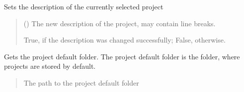 \documentclass[letterpaper,10pt,english]{sphinxmanual}
\begin{document}
\begin{fulllineitems}
\begin{fulllineitems}
\begin{quote}
\begin{description}
\sphinxAtStartPar
{}

\end{description}\end{quote}

\end{fulllineitems}


\begin{fulllineitems}
\label{\detokenize{apidoc/src.osm_configurator.control:src.osm_configurator.control.settings_controller.SettingsController.set_project_description}}
\pysigstartsignatures
{}
\pysigstopsignatures
\sphinxAtStartPar
Sets the description of the currently selected project
\begin{quote}\begin{description}
\sphinxAtStartPar
{} () \textendash{} The new description of the project, may contain line breaks.

\sphinxAtStartPar
True, if the description was changed successfully; False, otherwise.

\sphinxAtStartPar
{}

\end{description}\end{quote}

\end{fulllineitems}


\begin{fulllineitems}
\label{\detokenize{apidoc/src.osm_configurator.control:src.osm_configurator.control.settings_controller.SettingsController.get_project_default_folder}}
\pysigstartsignatures
{}
\pysigstopsignatures
\sphinxAtStartPar
Gets the project default folder.
The project default folder is the folder, where projects are stored by default.
\begin{quote}\begin{description}
\sphinxAtStartPar
The path to the project default folder


\end{description}
\end{quote}
\end{fulllineitems}
\end{fulllineitems}
\end{document}
